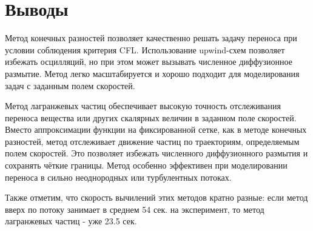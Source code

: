 \newpage


\section{Выводы}

Метод конечных разностей позволяет качественно решать задачу переноса при условии соблюдения критерия CFL. Использование upwind-схем позволяет избежать осцилляций, но при этом может вызывать численное диффузионное размытие. Метод легко масштабируется и хорошо подходит для моделирования задач с заданным полем скоростей.

Метод лагранжевых частиц обеспечивает высокую точность отслеживания переноса вещества или других скалярных величин в заданном поле скоростей. Вместо аппроксимации функции на фиксированной сетке, как в методе конечных разностей, метод отслеживает движение частиц по траекториям, определяемым полем скоростей. Это позволяет избежать численного диффузионного размытия и сохранять чёткие границы. Метод особенно эффективен при моделировании переноса в сильно неоднородных или турбулентных потоках.

Также отметим, что скорость вычилений этих методов кратно разные: если метод вверх по потоку занимает в среднем 54 сек. на эксперимент, то метод лагранжевых частиц - уже 23.5 сек.